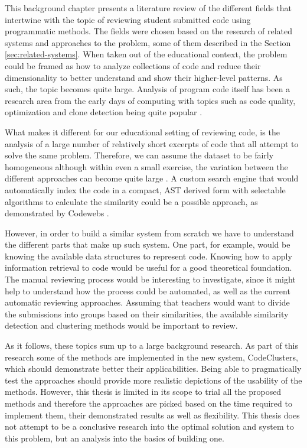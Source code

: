 This background chapter presents a literature review of the different fields that intertwine with the topic of reviewing student submitted code using programmatic methods. The fields were chosen based on the research of related systems and approaches to the problem, some of them described in the Section \ref{sec:related-systems}. When taken out of the educational context, the problem could be framed as how to analyze collections of code and reduce their dimensionality to better understand and show their higher-level patterns. As such, the topic becomes quite large. Analysis of program code itself has been a research area from the early days of computing \cite{halstead-1972, mccabe-1976, ottenstein} with topics such as code quality, optimization and clone detection being quite popular \cite{chaiyong-2018}.

What makes it different for our educational setting of reviewing code, is the analysis of a large number of relatively short excerpts of code that all attempt to solve the same problem. Therefore, we can assume the dataset to be fairly homogeneous although within even a small exercise, the variation between the different approaches can become quite large \cite{luxton-sub-variation-2013}. A custom search engine that would automatically index the code in a compact, AST derived form with selectable algorithms to calculate the similarity could be a possible approach, as demonstrated by Codewebs \cite{codewebs}.

However, in order to build a similar system from scratch we have to understand the different parts that make up such system. One part, for example, would be knowing the available data structures to represent code. Knowing how to apply information retrieval to code would be useful for a good theoretical foundation. The manual reviewing process would be interesting to investigate, since it might help to understand how the process could be automated, as well as the current automatic reviewing approaches. Assuming that teachers would want to divide the submissions into groups based on their similarities, the available similarity detection and clustering methods would be important to review.

As it follows, these topics sum up to a large background research. As part of this research some of the methods are implemented in the new system, CodeClusters, which should demonstrate better their applicabilities. Being able to pragmatically test the approaches should provide more realistic depictions of the usability of the methods. However, this thesis is limited in its scope to trial all the proposed methods and therefore the approaches are picked based on the time required to implement them, their demonstrated results as well as flexibility. This thesis does not attempt to be a conclusive research into the optimal solution and system to this problem, but an analysis into the basics of building one.

